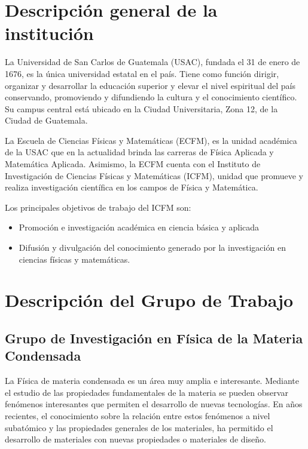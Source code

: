 \section{Descripción general de la institución}

La Universidad de San Carlos de Guatemala (USAC), fundada el 31 de enero de 1676, es la única universidad estatal en el país. Tiene como función dirigir, organizar y desarrollar la educación superior y elevar el nivel espiritual del país conservando, promoviendo y difundiendo la cultura y el conocimiento científico. Su campus central está ubicado en la Ciudad Universitaria, Zona 12, de la Ciudad de Guatemala.

\vspace{4mm}
\newline
La Escuela de Ciencias Físicas y Matemáticas (ECFM), es la unidad académica de la USAC que en la actualidad brinda las carreras de Física Aplicada y Matemática Aplicada. Asimismo, la ECFM cuenta con el Instituto de Investigación de Ciencias Físicas y Matemáticas (ICFM), unidad que promueve y realiza investigación científica en los campos de Física y Matemática. 

Los principales objetivos de trabajo del ICFM son:
\begin{itemize}
    \item Promoción e investigación académica en ciencia básica y aplicada
    \item Difusión y divulgación del conocimiento generado por la investigación en ciencias físicas y matemáticas.
\end{itemize}

\vspace{4mm}

\section{Descripción del Grupo de Trabajo}
\subsection{Grupo de Investigación en Física de la Materia Condensada}

La Física de materia condensada es un área muy amplia e interesante.  Mediante el estudio de las propiedades  fundamentales de la materia se pueden observar fenómenos interesantes que permiten el desarrollo de nuevas tecnologías.  En años recientes, el conocimiento sobre la relación entre estos fenómenos a nivel subatómico y las propiedades generales de los materiales, ha permitido el desarrollo de materiales con nuevas propiedades o materiales de diseño.

